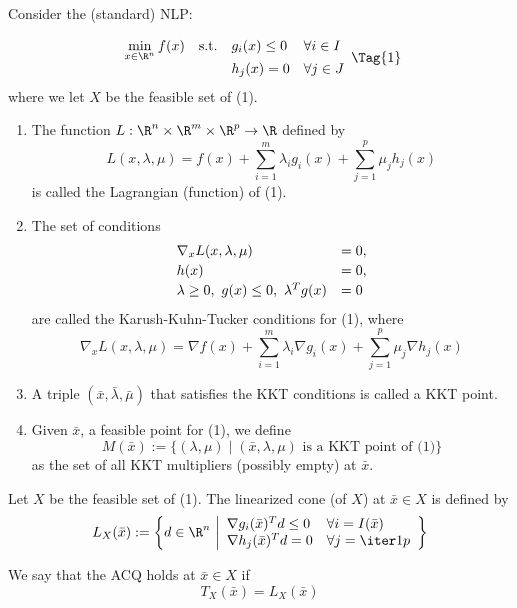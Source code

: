 \label{b38093d}

Consider the (standard) NLP:

\begin{equation*}
	\NlpStdForm
	\Tag{1}
\end{equation*}
where we let $X$ be the feasible set of (1).

\begin{enumerate}
	\item The function $L:\R^n\times\R^m\times\R^p\to\R$ defined by
	      $$
		      L(x,\lambda,\mu)=f(x)+\sum_{i=1}^m\lambda_ig_i(x)+\sum_{j=1}^p\mu_jh_j(x)
	      $$
	      is called the Lagrangian (function) of (1).
	\item The set of conditions
	      $$
		      \begin{array}{l l}
			      \nabla_xL(x,\lambda,\mu)                 & =0, \\[0.2em]
			      h(x)                                     & =0, \\[0.2em]
			      \lambda\geq0,\ g(x)\leq0,\ \lambda^Tg(x) & =0
		      \end{array}
	      $$
	      are called the Karush-Kuhn-Tucker conditions for (1), where
	      $$
		      \nabla_xL(x,\lambda,\mu)=\nabla f(x)+\sum_{i=1}^m\lambda_i\nabla g_i(x)+\sum_{j=1}^p\mu_j\nabla h_j(x)
	      $$
	\item A triple $(\bar x,\bar\lambda,\bar\mu)$ that satisfies the
	      KKT conditions is called a KKT point.
	\item Given $\bar x$, a feasible point for (1), we define
	      $$
		      M(\bar x):=\{(\lambda,\mu)\mid(\bar x,\lambda,\mu)\text{ is a KKT point of (1)}\}
	      $$
	      as the set of all KKT multipliers (possibly empty) at $\bar x$.
\end{enumerate}

\label{ca4f471}

Let $X$ be the feasible set of (1). The linearized cone (of $X$) at
$\bar x\in X$ is defined by
$$
	L_X(\bar x):=\left\{ d\in\R^n\ \middle\vert
	\begin{array}{l l}
		\nabla g_i(\bar x)^Td\leq0 & \forall i=I(\bar x) \\
		\nabla h_j(\bar x)^Td=0    & \forall j=\iter1p
	\end{array}
	\right\}
$$

\label{adc266e}

We say that the ACQ holds at $\bar x\in X$ if
$$
	T_X(\bar x)=L_X(\bar x)
$$

